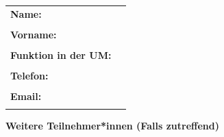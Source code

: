 \begin{titlepage}
	\begin{tabular}{lr}
		\textbf{Name:}               & \TextField[name=nameAust, width=5cm]{}    \\ \\
		\textbf{Vorname:}            & \TextField[name=surnameAust, width=5cm]{} \\ \\
		\textbf{Funktion in der UM:} & \TextField[name=funcAust, width=5cm]{}    \\ \\
		\textbf{Telefon:}            & \TextField[name=phoneAust, width=5cm]{}   \\ \\
		\textbf{Email:}              & \TextField[name=mailAust, width=5cm]{}    \\ \\
	\end{tabular}
	\vspace{0.5cm}

	{\textbf{Weitere Teilnehmer*innen (Falls zutreffend)}} \\
	\indent\TextField[multiline, name=WA,width=0.9\textwidth,  height=1.75cm, value={}]{}

\end{titlepage}
